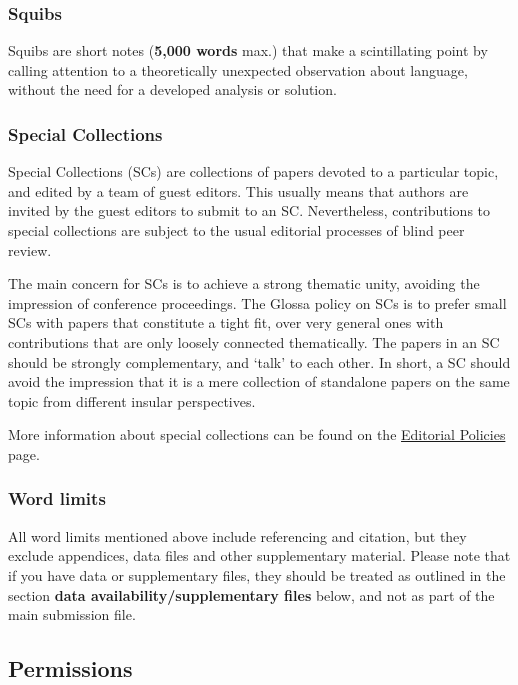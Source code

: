 \documentclass[charis,linguex]{glossa}
\begin{document}
\subsubsection{Squibs}

Squibs are short notes (\textbf{5,000 words} max.) that make a scintillating point by calling attention to a theoretically unexpected observation about language, without the need for a developed analysis or solution.

\subsubsection{Special Collections}

Special Collections (SCs) are collections of papers devoted to a particular topic, and edited by a team of guest editors. This usually means that authors are invited by the guest editors to submit to an SC. Nevertheless, contributions to special collections are subject to the usual editorial processes of blind peer review.

The main concern for SCs is to achieve a strong thematic unity, avoiding the impression of conference proceedings. The Glossa policy on SCs is to prefer small SCs with papers that constitute a tight fit, over very general ones with contributions that are only loosely connected thematically. The papers in an SC should be strongly complementary, and ‘talk’ to each other. In short, a SC should avoid the impression that it is a mere collection of standalone papers on the same topic from different insular perspectives.

More information about special collections can be found on the \href{https://www.glossa-journal.org/site/editorial-policies/}{Editorial Policies} page.



\subsubsection{Word limits}

All word limits mentioned above include referencing and citation, but they exclude appendices, data files and other supplementary material. Please note that if you have data or supplementary files, they should be treated as outlined in the section \textbf{data availability/supplementary files} below, and not as part of the main submission file.


\subsection{Permissions}
\end{document}
